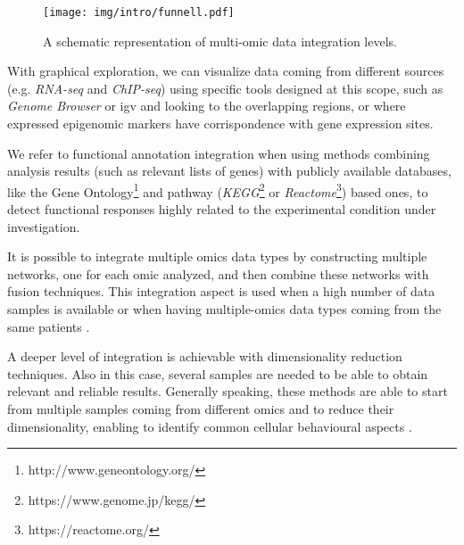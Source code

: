 \begin{figure}[h]
\centering
\texttt{[image: img/intro/funnell.pdf]}
\caption[Integration Funnell]{A schematic representation of multi-omic data integration levels.}
\label{fig:funnell}
\end{figure}

With graphical exploration, we can visualize data coming from different sources (e.g. \textit{RNA-seq} and \textit{ChIP-seq}) using specific tools designed at this scope, such as \textit{Genome Browser} \cite{Karolchik2011} or \gls{igv} \cite{Robinson2011, Thorvaldsdottir2013} and looking to the overlapping regions, or where expressed epigenomic markers have corrispondence with gene expression sites.

We refer to functional annotation integration when using methods combining analysis results (such as relevant lists of genes) with publicly available databases,  like the Gene Ontology\footnote{http://www.geneontology.org/} and pathway (\textit{KEGG}\footnote{https://www.genome.jp/kegg/} or \textit{Reactome}\footnote{https://reactome.org/}) based ones, to detect functional responses highly related to the experimental condition under investigation.

It is possible to integrate multiple omics data types by constructing multiple networks, one for each omic analyzed, and then combine these networks with fusion techniques.
This integration aspect is used when a high number of data samples is available or when having multiple-omics data types coming from the same patients \cite{Wang2014}.

A deeper level of integration is achievable with dimensionality reduction techniques. 
Also in this case, several samples are needed to be able to obtain relevant and reliable results.
Generally speaking, these methods are able to start from multiple samples coming from different omics and to reduce their dimensionality, enabling to identify common cellular behavioural aspects \cite{Rohart2017, Argelaguet2018}.



